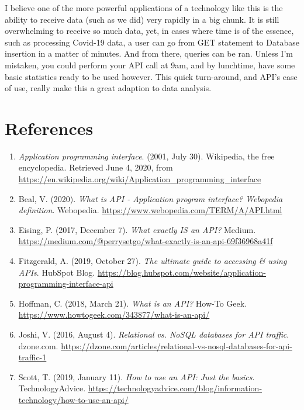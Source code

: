 \documentclass[]{article}
\begin{document}
I believe one of the more powerful applications of a technology like this is the ability to receive data (such as we did) very rapidly in a big chunk.  It is still overwhelming to receive so much data, yet, in cases where time is of the essence, such as processing Covid-19 data, a user can go from GET statement to Database insertion in a matter of minutes.  And from there, queries can be ran.  Unless I'm mistaken, you could perform your API call at 9am, and by lunchtime, have some basic statistics ready to be used however.  This quick turn-around, and API's ease of use, really make this a great adaption to data analysis.
\section{References}
\begin{enumerate}
	\item \textit{Application programming interface}. (2001, July 30). Wikipedia, the free encyclopedia. Retrieved June 4, 2020, from \url{https://en.wikipedia.org/wiki/Application_programming_interface}
	
	\item Beal, V. (2020). \textit{What is API - Application program interface? Webopedia definition}. Webopedia. \url{https://www.webopedia.com/TERM/A/API.html}
	
	\item Eising, P. (2017, December 7). \textit{What exactly IS an API?} Medium. \url{https://medium.com/@perrysetgo/what-exactly-is-an-api-69f36968a41f}
	
	\item Fitzgerald, A. (2019, October 27). \textit{The ultimate guide to accessing \& using APIs}. HubSpot Blog. \url{https://blog.hubspot.com/website/application-programming-interface-api}
	
	\item Hoffman, C. (2018, March 21). \textit{What is an API?} How-To Geek. \url{https://www.howtogeek.com/343877/what-is-an-api/}
	
	\item Joshi, V. (2016, August 4). \textit{Relational vs. NoSQL databases for API traffic}. dzone.com. \url{https://dzone.com/articles/relational-vs-nosql-databases-for-api-traffic-1}
	
	\item Scott, T. (2019, January 11). \textit{How to use an API: Just the basics}. TechnologyAdvice. \url{https://technologyadvice.com/blog/information-technology/how-to-use-an-api/}
\end{enumerate}
\end{document}
